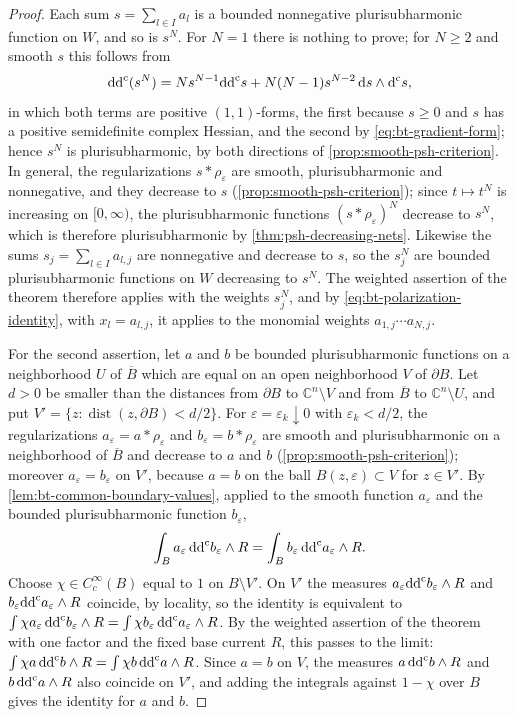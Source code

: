 \begin{proof}
Each sum $s=\sum_{l\in I}a_l$ is a bounded nonnegative plurisubharmonic function on $W$, and so is $s^N$. For $N=1$ there is nothing to prove; for $N\ge2$ and smooth $s$ this follows from
\[
 \mathrm{dd}^{\mathrm{c}}(s^N)=Ns^{N-1}\mathrm{dd}^{\mathrm{c}} s+N(N-1)s^{N-2}\,\mathrm{d}s\wedge\mathrm{d}^{\mathrm c}s,
\]
in which both terms are positive $(1,1)$-forms, the first because $s\ge0$ and $s$ has a positive semidefinite complex Hessian, and the second by \eqref{eq:bt-gradient-form}; hence $s^N$ is plurisubharmonic, by both directions of \cref{prop:smooth-psh-criterion}. In general, the regularizations $s*\rho_\varepsilon$ are smooth, plurisubharmonic and nonnegative, and they decrease to $s$ (\cref{prop:smooth-psh-criterion}); since $t\mapsto t^N$ is increasing on $[0,\infty)$, the plurisubharmonic functions $(s*\rho_\varepsilon)^N$ decrease to $s^N$, which is therefore plurisubharmonic by \cref{thm:psh-decreasing-nets}. Likewise the sums $s_j=\sum_{l\in I}a_{l,j}$ are nonnegative and decrease to $s$, so the $s_j^N$ are bounded plurisubharmonic functions on $W$ decreasing to $s^N$. The weighted assertion of the theorem therefore applies with the weights $s_j^N$, and by \eqref{eq:bt-polarization-identity}, with $x_l=a_{l,j}$, it applies to the monomial weights $a_{1,j}\cdots a_{N,j}$.

For the second assertion, let $a$ and $b$ be bounded plurisubharmonic functions on a neighborhood $U$ of $\overline B$ which are equal on an open neighborhood $V$ of $\partial B$. Let $d>0$ be smaller than the distances from $\partial B$ to $\mathbb C^n\setminus V$ and from $\overline B$ to $\mathbb C^n\setminus U$, and put $V'=\{z:\operatorname{dist}(z,\partial B)<d/2\}$. For $\varepsilon=\varepsilon_k\downarrow0$ with $\varepsilon_k<d/2$, the regularizations $a_\varepsilon=a*\rho_\varepsilon$ and $b_\varepsilon=b*\rho_\varepsilon$ are smooth and plurisubharmonic on a neighborhood of $\overline B$ and decrease to $a$ and $b$ (\cref{prop:smooth-psh-criterion}); moreover $a_\varepsilon=b_\varepsilon$ on $V'$, because $a=b$ on the ball $B(z,\varepsilon)\subset V$ for $z\in V'$. By \cref{lem:bt-common-boundary-values}, applied to the smooth function $a_\varepsilon$ and the bounded plurisubharmonic function $b_\varepsilon$,
\[
 \int_Ba_\varepsilon\,\mathrm{dd}^{\mathrm{c}} b_\varepsilon\wedge R=\int_Bb_\varepsilon\,\mathrm{dd}^{\mathrm{c}} a_\varepsilon\wedge R.
\]
Choose $\chi\in C^\infty_c(B)$ equal to $1$ on $B\setminus V'$. On $V'$ the measures $a_\varepsilon\mathrm{dd}^{\mathrm{c}} b_\varepsilon\wedge R$ and $b_\varepsilon\mathrm{dd}^{\mathrm{c}} a_\varepsilon\wedge R$ coincide, by locality, so the identity is equivalent to $\int\chi a_\varepsilon\,\mathrm{dd}^{\mathrm{c}} b_\varepsilon\wedge R=\int\chi b_\varepsilon\,\mathrm{dd}^{\mathrm{c}} a_\varepsilon\wedge R$. By the weighted assertion of the theorem with one factor and the fixed base current $R$, this passes to the limit: $\int\chi a\,\mathrm{dd}^{\mathrm{c}} b\wedge R=\int\chi b\,\mathrm{dd}^{\mathrm{c}} a\wedge R$. Since $a=b$ on $V$, the measures $a\,\mathrm{dd}^{\mathrm{c}} b\wedge R$ and $b\,\mathrm{dd}^{\mathrm{c}} a\wedge R$ also coincide on $V'$, and adding the integrals against $1-\chi$ over $B$ gives the identity for $a$ and $b$.
\end{proof}

